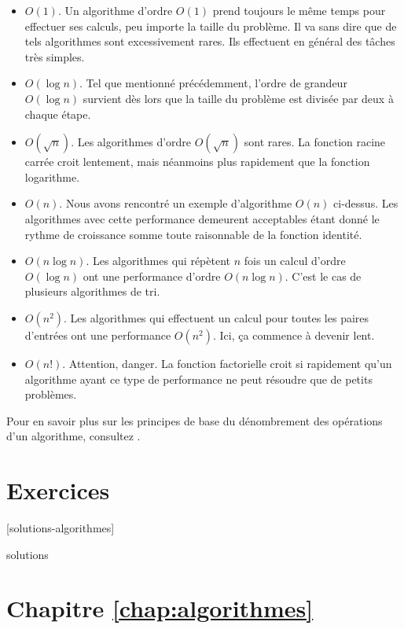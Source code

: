 \begin{itemize}
\item $O(1)$. Un algorithme d'ordre $O(1)$ prend toujours le même
  temps pour effectuer ses calculs, peu importe la taille du problème.
  Il va sans dire que de tels algorithmes sont excessivement rares. Ils
  effectuent en général des tâches très simples.
\item $O(\log n)$. Tel que mentionné précédemment, l'ordre de grandeur
  $O(\log n)$ survient dès lors que la taille du problème est divisée
  par deux à chaque étape.
\item $O(\sqrt{n})$. Les algorithmes d'ordre $O(\sqrt{n})$ sont rares.
  La fonction racine carrée croit lentement, mais néanmoins plus
  rapidement que la fonction logarithme.
\item $O(n)$. Nous avons rencontré un exemple d'algorithme $O(n)$
  ci-dessus. Les algorithmes avec cette performance demeurent
  acceptables étant donné le rythme de croissance somme toute
  raisonnable de la fonction identité.
\item $O(n \log n)$. Les algorithmes qui répètent $n$ fois un calcul
  d'ordre $O(\log n)$ ont une performance d'ordre $O(n \log n)$.
  C'est le cas de plusieurs algorithmes de tri.
\item $O(n^2)$. Les algorithmes qui effectuent un calcul pour toutes
  les paires d'entrées ont une performance $O(n^2)$. Ici, ça commence
  à devenir lent.
\item $O(n!)$. Attention, danger. La fonction factorielle croit si
  rapidement qu'un algorithme ayant ce type de performance ne peut
  résoudre que de petits problèmes.
\end{itemize}

Pour en savoir plus sur les principes de base du dénombrement des
opérations d'un algorithme, consultez
\citet[chapitre~1]{Stephens:algorithms:2013}.



\section{Exercices}
\label{sec:algorithmes:exercices}

[solutions-algorithmes]

\begin{Filesave}{solutions}
\section*{Chapitre \ref*{chap:algorithmes}}

\begingroup

\end{Filesave}


